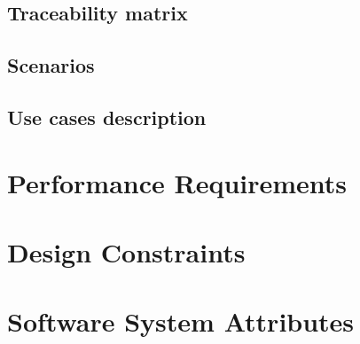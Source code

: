     \subsection{Traceability matrix}

    \subsection{Scenarios}

    \subsection{Use cases description}

\section{Performance Requirements}

\section{Design Constraints}

\section{Software System Attributes}
